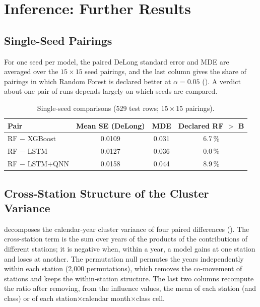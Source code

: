 \documentclass[11pt,a4paper]{article}
\begin{document}
\section{Inference: Further Results}
\label{app:inference}

\subsection{Single-Seed Pairings}
\label{app:single_seed}

For one seed per model, the paired DeLong standard error and MDE are averaged over the $15\times15$ seed pairings, and the last column gives the share of pairings in which Random Forest is declared better at $\alpha=0.05$ (). A verdict about one pair of runs depends largely on which seeds are compared.

\begin{table}[htbp]
\centering
\caption{Single-seed comparisons (529 test rows; $15\times15$ pairings).}
\label{tab:single_seed}
{\small
\begin{tabular}{lccc}
\toprule
\textbf{Pair} & \textbf{Mean SE (DeLong)} & \textbf{MDE} & \textbf{Declared RF $>$ B} \\
\midrule
RF $-$ XGBoost & 0.0109 & 0.031 & 6.7\,\% \\
RF $-$ LSTM & 0.0127 & 0.036 & 0.0\,\% \\
RF $-$ LSTM+QNN & 0.0158 & 0.044 & 8.9\,\% \\
\bottomrule
\end{tabular}}
\end{table}

\subsection{Cross-Station Structure of the Cluster Variance}
\label{app:cancellation}

 decomposes the calendar-year cluster variance of four paired differences (). The cross-station term is the sum over years of the products of the contributions of different stations; it is negative when, within a year, a model gains at one station and loses at another. The permutation null permutes the years independently within each station (2{,}000 permutations), which removes the co-movement of stations and keeps the within-station structure. The last two columns recompute the ratio after removing, from the influence values, the mean of each station (and class) or of each station$\times$calendar month$\times$class cell.
\end{document}
